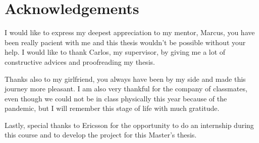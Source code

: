 \cleardoublepage
{}
\chapter*{Acknowledgements}



I would like to express my deepest appreciation to my mentor, Marcus, you
have been really pacient with me and this thesis wouldn't be possible 
without your help. I would like to thank Carlos, my supervisor, by giving
me a lot of constructive advices and proofreading my thesis.

Thanks also to my girlfriend, you always have been by my side and made 
this journey more pleasant. I am also very thankful for the company of 
classmates, even though we could not be in class physically this year 
because of the pandemic, but I will remember this stage of life with 
much gratitude.

Lastly, special thanks to Ericsson for the opportunity to do an internship 
during this course and to develop the project for this Master's thesis.
